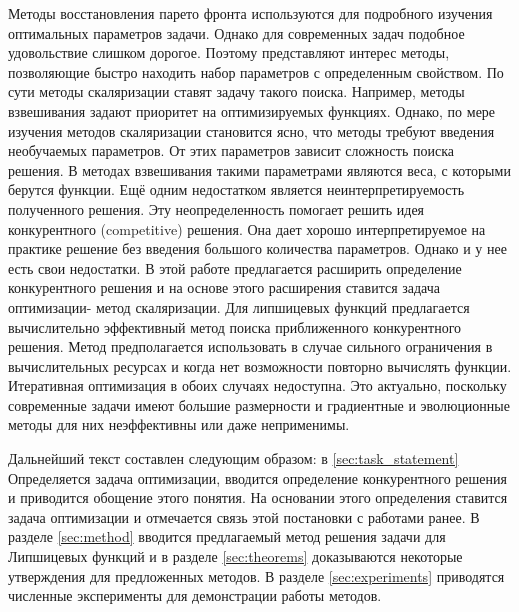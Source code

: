 Методы восстановления парето фронта используются для подробного изучения оптимальных параметров задачи. Однако для современных задач подобное удовольствие слишком дорогое. Поэтому представляют интерес методы, позволяющие быстро находить набор параметров с определенным свойством. По сути методы скаляризации ставят задачу такого поиска. Например, методы взвешивания задают приоритет на оптимизируемых функциях. Однако, по мере изучения методов скаляризации становится ясно, что методы требуют введения необучаемых параметров. От этих параметров зависит сложность поиска решения. В методах взвешивания такими параметрами являются веса, с которыми берутся функции. Ещё одним недостатком является неинтерпретируемость полученного решения. Эту неопределенность помогает решить идея конкурентного (competitive) решения. Она дает хорошо интерпретируемое на практике решение без введения большого количества параметров. Однако и у нее есть свои недостатки. В этой работе предлагается расширить определение конкурентного решения и на основе этого расширения ставится задача оптимизации- метод скаляризации. Для липшицевых функций предлагается вычислительно эффективный метод поиска приближенного конкурентного решения. Метод предполагается использовать в случае сильного ограничения в вычислительных ресурсах и когда нет возможности повторно вычислять функции. Итеративная оптимизация в обоих случаях недоступна. Это актуально, поскольку современные задачи имеют большие размерности и градиентные и эволюционные методы для них неэффективны или даже неприменимы.

Дальнейший текст составлен следующим образом: в \ref{sec:task_statement} Определяется задача оптимизации, вводится определение конкурентного решения и приводится обощение этого понятия. На основании этого определения ставится задача оптимизации и отмечается связь этой постановки с работами ранее. В разделе \ref{sec:method} вводится предлагаемый метод решения задачи для Липшицевых функций и в разделе \ref{sec:theorems} доказываются некоторые утверждения для предложенных методов. В разделе \ref{sec:experiments} приводятся численные эксперименты для демонстрации работы методов.